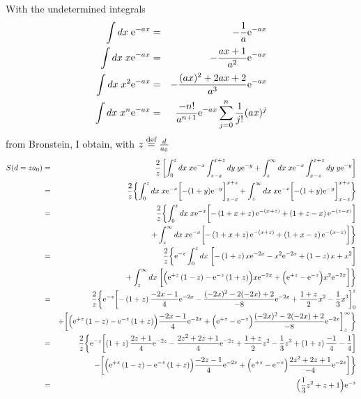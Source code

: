 \documentclass[11pt,a4paper]{report}
\begin{document}
With the undetermined integrals
\begin{eqnarray}
\int dx\; \mathrm{e}^{-ax}&=&-\frac{1}{a}\mathrm{e}^{-ax}
\nonumber\\
\int dx\; x\mathrm{e}^{-ax}&=&-\frac{ax+1}{a^2}\mathrm{e}^{-ax}
\nonumber\\
\int dx\; x^2\mathrm{e}^{-ax}&=&-\frac{(ax)^2+2ax+2}{a^3}\mathrm{e}^{-ax}
\nonumber\\
\int dx\; x^n\mathrm{e}^{-ax}&=&\frac{-n!}{a^{n+1}}\mathrm{e}^{-ax}
\sum_{j=0}^n \frac{1}{j!}(ax)^j
\label{eq:formulapowerexponential}
\end{eqnarray}
from Bronstein, I obtain, with $z\stackrel{\text{def}}{=}\frac{d}{a_0}$
\begin{eqnarray}
S(d=za_0)
&=&\frac{2}{z}
\left[
\int_0^{z} dx\;x \e{-x}\int_{z-x}^{x+z}dy\;y \e{-y}
+\int_{z}^\infty dx\;x \e{-x}\int_{x-z}^{x+z}dy\;y \e{-y}
\right]
\nonumber\\
%
%
%
&=&\frac{2}{z}
\biggl\lbrace
\int_0^{z} dx\;x \e{-x}
\biggl[-(1+y)\e{-y}\biggr]_{z-x}^{x+z}
+\int_{z}^\infty dx\;x \e{-x}
\biggl[-(1+y)\e{-y}\biggr]_{x-z}^{x+z}
\biggr\rbrace
\nonumber\\
%
%
%
&=&\frac{2}{z}
\biggl\lbrace
\int_0^{z} dx\;x \e{-x}
\biggl[
-\left(1+x+z\right)\e{-(x+z)}
+\left(1+z-x\right)\e{-(z-x)}
\biggr]
\nonumber\\
&&\hspace{0.2cm}
+\int_{z}^\infty dx\;x \e{-x}
\biggl[
-\left(1+x+z\right)\e{-(x+z)}
+\left(1+x-z\right)\e{-(x-z)}
\biggr]
\biggr\rbrace
\nonumber\\
%
%
%
&=&\frac{2}{z}
\biggl\lbrace
\e{-z}\int_0^{z} dx\;
\biggl[
-\left(1+z\right)x\e{-2x}-x^2\e{-2x}
+\left(1-z\right)x+x^2
\biggr]
\nonumber\\
&&\hspace{1.cm}
+\int_{z}^\infty dx\; 
\biggl[
\Bigl(\e{+z}\left(1-z\right)-\e{-z}\left(1+z\right)\Bigr)x\e{-2x}
+\Bigl(\e{+z}-\e{-z}\Bigr)x^2\e{-2x}
\biggr]
\biggr\rbrace
\nonumber\\
%
%
%
&=&\frac{2}{z}
\biggl\lbrace
\e{-z}
\biggl[
-\left(1+z\right)\frac{-2x-1}{4}\e{-2x}
-\frac{(-2x)^2-2(-2x)+2}{-8}\e{-2x}
+\frac{1+z}{2}x^2
-\frac{1}{3}x^3
\biggr]_0^{z}
\nonumber\\
&&
+
\biggl[
\Bigl(\e{+z}\left(1-z\right)-\e{-z}\left(1+z\right)\Bigr)
\frac{-2x-1}{4}\e{-2x}
+\Bigl(\e{+z}-\e{-z}\Bigr)\frac{(-2x)^2-2(-2x)+2}{-8}\e{-2x}
\biggr]_{z}^\infty 
\biggr\rbrace
\nonumber\\
%
%
%
&=&\frac{2}{z}
\biggl\lbrace
\e{-z}
\biggl[
\left(1+z\right)\frac{2z+1}{4}\e{-2z}
-\frac{2z^2+2z+1}{4}\e{-2z}
+\frac{1+z}{2}z^2
-\frac{1}{3}z^3
+\left(1+z\right)\frac{-1}{4}
-\frac{1}{4}
\biggr]
\nonumber\\
&&
-
\biggl[
\Bigl(\e{+z}\left(1-z\right)-\e{-z}\left(1+z\right)\Bigr)
\frac{-2z-1}{4}\e{-2z}
+\Bigl(\e{+z}-\e{-z}\Bigr)\frac{2z^2+2z+1}{-4}\e{-2z}
\biggr]
\biggr\rbrace
\nonumber\\
%
%
%
&=&
\Bigl(\frac{1}{3}z^2+z+1\Bigr)\e{-z}
\end{eqnarray}
\end{document}
